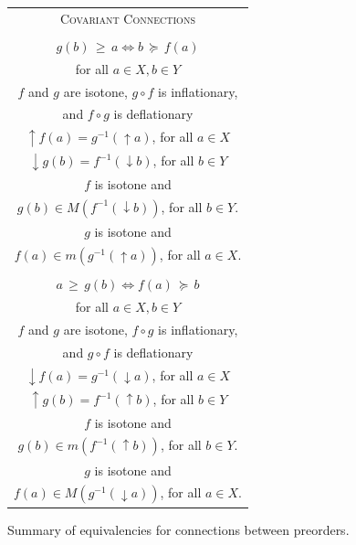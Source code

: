 \documentclass[
  letterpaper,
  10pt,
  reqno,
  twopage,
  openany]{book}
\theoremstyle{plain}
\theoremstyle{definition}
\theoremstyle{definition}
\theoremstyle{definition}
\theoremstyle{plain}
\theoremstyle{plain}
\theoremstyle{remark}
\begin{document}
\begin{figure}[htb]
\begin{tabular}{|c|}
\textsc{Covariant Connections}
\\[5pt]
\begin{minipage}{.45\textwidth} \centering 
$(f,g):(X,\geq) \leftrightarrow (Y,\succeq)$
\\[5pt] 
$g(b)\,\geq\,a \Leftrightarrow b\,\succeq\,f(a)$ \\ for all $a\in X, b\in Y$
\\[5pt] 
$f$ and $g$ are isotone, $g\circ f$ is inflationary, \\ and $f\circ g$ is deflationary
\\[5pt] 
${\uparrow} f(a)=g^{-1}({\uparrow} a)$, for all $a\in X$
\\[5pt] 
${\downarrow} g(b)=f^{-1}({\downarrow} b)$, for all $b\in Y$
\\[5pt] 
$f$ is isotone and \\ ${g(b)\in M(f^{-1}({\downarrow} b))}$, for all $b\in Y$.
\\[5pt] 
$g$ is isotone and \\ ${f(a)\in m(g^{-1}({\uparrow} a))}$, for all $a\in X$.
\\[-1pt] 
\end{minipage}
\begin{minipage}{.45\textwidth} \centering 
$(f,g):(X,\geq) \leftrightarrow (Y,\succeq)$
\\[5pt] 
$a\,\geq\,g(b) \Leftrightarrow f(a)\,\succeq\,b$ \\ for all $a\in X, b\in Y$
\\[5pt] 
$f$ and $g$ are isotone, $f\circ g$ is inflationary, \\ and $g\circ f$ is deflationary
\\[5pt] 
${\downarrow} f(a)=g^{-1}({\downarrow} a)$, for all $a\in X$
\\[5pt] 
${\uparrow} g(b)=f^{-1}({\uparrow} b)$, for all $b\in Y$
\\[5pt] 
$f$ is isotone and \\ ${g(b)\in m(f^{-1}({\uparrow} b))}$, for all $b\in Y$.
\\[5pt] 
$g$ is isotone and \\ ${f(a)\in M(g^{-1}({\downarrow} a))}$, for all $a\in X$.
\vspace{5pt}
\end{minipage}
\\ \hline
\end{tabular}
\caption{Summary of equivalencies for connections between preorders.}
\label{sumconn}
\end{figure}
\end{document}
